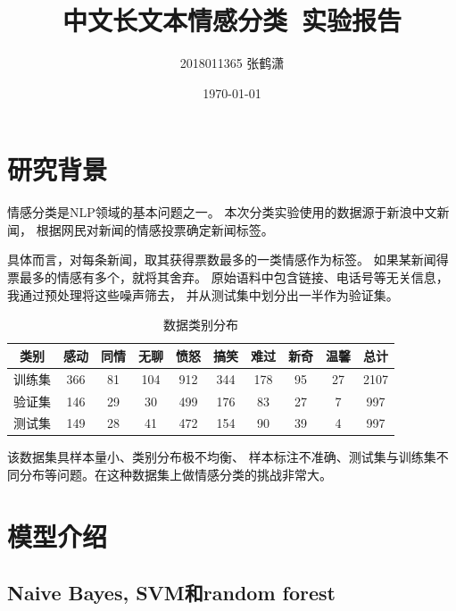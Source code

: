 \documentclass[12pt, UTF8, a4paper]{ctexart}
\title{中文长文本情感分类\ 实验报告}
\author{2018011365 张鹤潇}
\date{\today}
\begin{document}
\begin{titlepage}
    
\maketitle

\tableofcontents

\thispagestyle{empty}
\end{titlepage}

\setcounter{page}{1}

\section{研究背景}

情感分类是NLP领域的基本问题之一。
本次分类实验使用的数据源于新浪中文新闻，
根据网民对新闻的情感投票确定新闻标签。

具体而言，对每条新闻，取其获得票数最多的一类情感作为标签。
如果某新闻得票最多的情感有多个，就将其舍弃。
原始语料中包含链接、电话号等无关信息，我通过预处理将这些噪声筛去，
并从测试集中划分出一半作为验证集。

\begin{table}[htbp]
    \centering
    \caption{\label{tab:1} 数据类别分布}
    \begin{tabular}{cccccccccc}
    \toprule 
        类别 & 感动 & 同情 & 无聊 & 愤怒 & 搞笑 & 难过 & 新奇 & 温馨 & 总计 \\
        \midrule 
        训练集 & 366 & 81 & 104 & 912 & 344 & 178 & 95 & 27 & 2107 \\
        验证集 & 146 & 29 & 30 & 499 & 176 & 83 & 27 & 7 & 997 \\
        测试集 & 149 & 28 & 41 & 472 & 154 & 90 & 39 & 4 & 997 \\
        \bottomrule 
    \end{tabular}
\end{table}

该数据集具样本量小、类别分布极不均衡、
样本标注不准确、测试集与训练集不同分布等问题。在这种数据集上做情感分类的挑战非常大。

\section{模型介绍}

\subsection{Naive Bayes, SVM和random forest}
\end{document}
